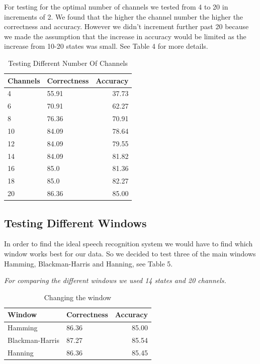 \documentclass[	DIV=calc,%
							paper=a4,%
							fontsize=9.8pt,%
							twocolumn]{scrartcl}	 					%
\begin{document}
For testing for the optimal number of channels we tested from 4 to 20 in increments of 2. We found that the higher the channel number the higher the correctness and accuracy. However we didn't increment further past 20 because we made the assumption that the increase in accuracy would be limited as the increase from 10-20 states was small. See Table 4 for more details.
\begin{table}[h]
	\caption{Testing Different Number Of Channels}
	\centering
	\begin{tabular}{llr}
		
		\cmidrule(r){1-3}
		Channels & Correctness & Accuracy \\
		\midrule
		4 & 55.91 & 37.73 \\
		6  & 70.91  & 62.27 \\
		8   & 76.36  & 70.91 \\
		10   & 84.09 & 78.64\\
		12   & 84.09  & 79.55 \\
		14   & 84.09  & 81.82 \\
		16  & 85.0  & 81.36 \\
		18  & 85.0  & 82.27 \\
		20  & 86.36  & 85.00 \\
	\end{tabular}
\end{table}

\subsection{Testing Different Windows}
In order to find the ideal speech recognition system we would have to find which window works best for our data. So we decided to test three of the main windows Hamming, Blackman-Harris and Hanning, see Table 5.

\textit{For comparing the different windows we used 14 states and 20 channels.}
\begin{table}[h]
	\caption{Changing the window}
	\centering
	\begin{tabular}{llr}
		
		\cmidrule(r){1-3}
		Window & Correctness & Accuracy \\
		\midrule
		Hamming & 86.36 & 85.00 \\
		Blackman-Harris  & 87.27  & 85.54 \\
		Hanning   & 86.36  & 85.45 \\
		
	\end{tabular}
\end{table}
\end{document}

